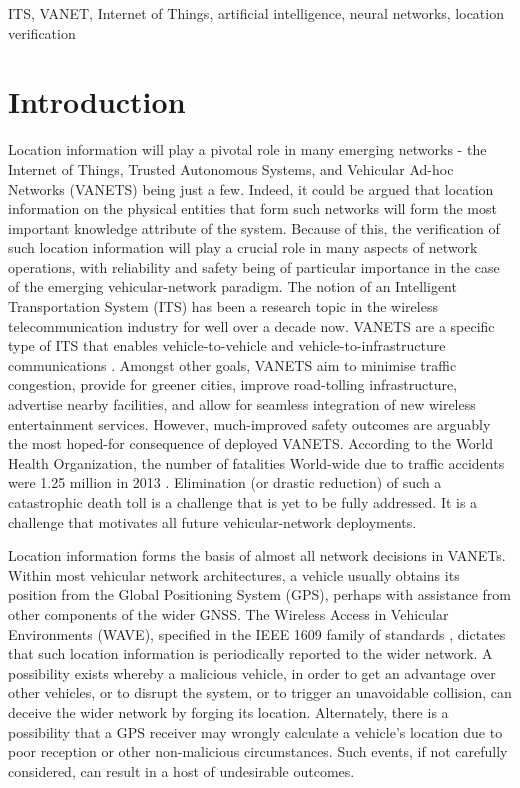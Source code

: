 \documentclass[journal]{IEEEtran}
\begin{document}
\begin{IEEEkeywords}
        ITS, VANET, Internet of Things, artificial intelligence, neural networks, location verification
\end{IEEEkeywords}

\section{Introduction}
Location information will play a pivotal role in many emerging networks - the Internet of Things, Trusted Autonomous Systems, and Vehicular Ad-hoc Networks (VANETS) being just a few. Indeed, it could be argued that location information on the physical entities that form such networks will form the most important knowledge attribute of the system. Because of this, the verification of such location information will play a crucial role in many aspects of network operations, with reliability and safety being of particular importance in the case of the emerging vehicular-network paradigm.
The notion of an Intelligent Transportation System (ITS) has been a research topic in the wireless telecommunication industry for well over a decade now. VANETS are a specific type of ITS that enables vehicle-to-vehicle and vehicle-to-infrastructure communications \cite{hartenstein2008tutorial}. %
Amongst other goals, VANETS aim to minimise traffic congestion, provide for greener cities, improve road-tolling infrastructure, advertise nearby facilities, and allow for seamless integration of new
wireless entertainment services.  However, much-improved safety outcomes are arguably the most hoped-for consequence of deployed VANETS.  According to the World Health Organization, the number of fatalities World-wide due to traffic accidents were 1.25 million in 2013 \cite{who}. %
Elimination (or drastic reduction) of such a catastrophic death toll is a challenge that is yet to be fully addressed. It is a challenge that motivates all future vehicular-network deployments.

Location information forms the basis of almost all network decisions in VANETs. Within  most vehicular network architectures, a vehicle usually obtains its position from the Global Positioning System (GPS), perhaps with assistance from other components of the wider GNSS. The Wireless Access in Vehicular Environments (WAVE), specified in the IEEE 1609 family of standards \cite{meneguetteintelligent}, dictates that such location information is periodically reported to the wider network. A possibility exists whereby a malicious vehicle, in order to get an advantage over other vehicles, or to disrupt the system, or to trigger an unavoidable collision, can deceive the wider network by forging its location. Alternately, there is a possibility that a GPS receiver may wrongly calculate a vehicle's location due to poor reception or other non-malicious circumstances. Such events, if not carefully considered, can result in a host of undesirable outcomes.
\end{document}
